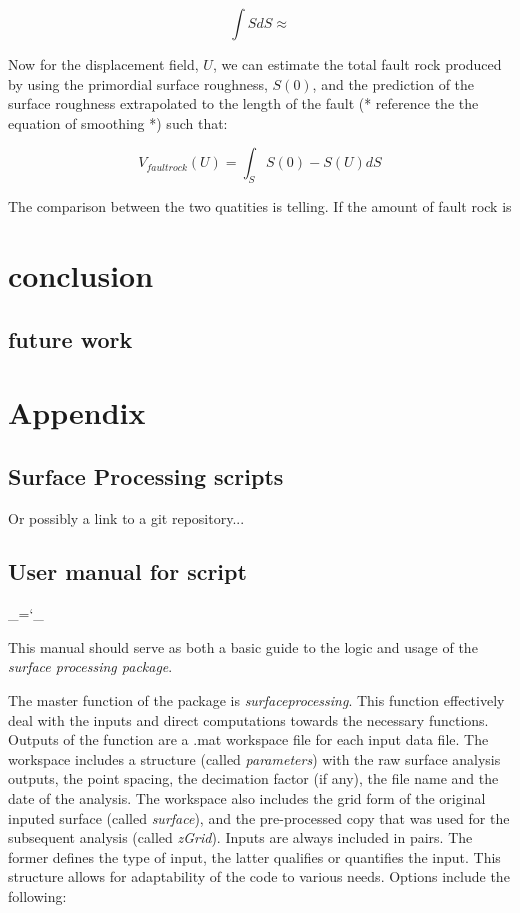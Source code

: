 \documentclass[12pt,a4paper]{article}
\begin{document}
\begin{itemize}
\begin{equation}
	\int S dS \approx 
\end{equation}

Now for the displacement field, $U$, we can estimate the total fault rock produced by using the primordial surface roughness, $S(0)$, and the prediction of the surface roughness extrapolated to the length of the fault (* reference the the equation of smoothing *) such that:

\begin{equation}
	V_{fault rock}(U) = \int_S S(0)-S(U)dS
\end{equation}

The comparison between the two quatities is telling. If the amount of fault rock is

\section{conclusion}
	\subsection{future work}

\section{Appendix}

\subsection{Surface Processing scripts}

Or possibly a link to a git repository...

\subsection{User manual for script}

\chardef\_=`_

This manual should serve as both a basic guide to the logic and usage of the \textit{surface processing package}. 

The master function of the package is \textit{surfaceprocessing}. This function effectively deal with the inputs and direct computations towards the necessary functions. Outputs of the function are a .mat workspace file for each input data file. The workspace includes a structure (called \textit{parameters}) with the raw surface analysis outputs, the point spacing, the decimation factor (if any), the file name and the date of the analysis. The workspace also includes the grid form of the original inputed surface (called \textit{surface}), and the pre-processed copy that was used for the subsequent analysis (called \textit{zGrid}).  Inputs are always included in pairs. The former defines the type of input, the latter qualifies or quantifies the input. This structure allows for adaptability of the code to various needs. Options include the following:


\end{itemize}
\end{document}
